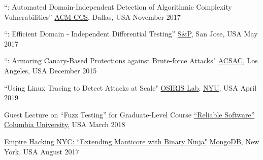 
\vspace{0.025in}

\vspace{0.025in}
\begin{cvhonorswide2}
    \cvhonorwide
    {}
    {``\slowfuzz: Automated Domain-Independent Detection of Algorithmic Complexity Vulnerabilities''}
    {\href{https://ccs2017.sigsac.org/}{ACM CCS}, Dallas, USA}
    {November 2017}
\end{cvhonorswide2}

\vspace{0.025in}
\begin{cvhonorswide2}
    \cvhonorwide
    {}
    {``\nezha: Efficient Domain - Independent Differential Testing''}
    {\href{https://www.ieee-security.org/TC/SP2017/}{S\&P}, San Jose, USA}
    {May 2017}
\end{cvhonorswide2}

\vspace{0.025in}
\begin{cvhonorswide2}
  \cvhonorwide
    {}
    {``\dynaguard: Armoring Canary-Based Protections against Brute-force Attacks"}
    {\href{https://www.acsac.org/2015/}{ACSAC}, Los Angeles, USA}
    {December 2015}

\end{cvhonorswide2}


\vspace{0.025in}
\begin{cvhonorswide2}
\cvhonorwide
    {}
    {``Using Linux Tracing to Detect Attacks at Scale"}
    {\href{https://www.osiris.cyber.nyu.edu/}{OSIRIS Lab}, \href{https://engineering.nyu.edu/}{NYU}, USA}
    {April 2019}
\end{cvhonorswide2}

\vspace{0.025in}
\begin{cvhonorswide2}
\cvhonorwide
    {}
    {Guest Lecture on ``Fuzz Testing'' for Graduate-Level Course \href{http://www.cs.columbia.edu/~junfeng/18sp-e6121/syllabus.html}{``Reliable Software''}}
    {\href{http://www.cs.columbia.edu/}{Columbia University}, USA}
    {March 2018}
\end{cvhonorswide2}

\vspace{0.025in}
\begin{cvhonorswide2}
\cvhonorwide
    {}
    {\href{https://www.meetup.com/Empire-Hacking/events/239192018}{Empire
            Hacking NYC: ``Extending Manticore with Binary Ninja"}}
    {\href{https://www.mongodb.com/}{MongoDB}, New York, USA}
    {August 2017}
\end{cvhonorswide2}

